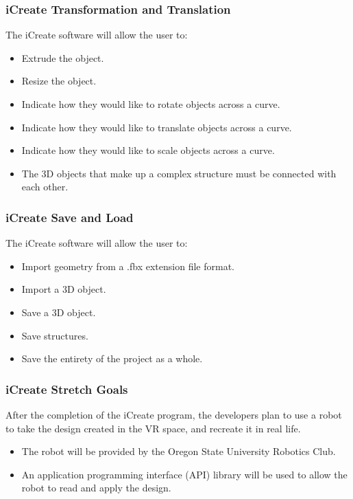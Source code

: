 \documentclass[letterpaper,draftclsnofoot,onecolumn,10 pt,compsoc]{IEEEtran}
\begin{document}
\subsubsection{iCreate Transformation and Translation}
The iCreate software will allow the user to:
\begin{itemize}
\item Extrude the object.
\item Resize the object.
\item Indicate how they would like to rotate objects across a curve. 
\item Indicate how they would like to translate objects across a curve. 
\item Indicate how they would like to scale objects across a curve. 
\item The 3D objects that make up a complex structure must be connected with each other.
\end{itemize}

\subsubsection{iCreate Save and Load}
The iCreate software will allow the user to:
\begin{itemize}
\item Import geometry from a .fbx extension file format.
\item Import a 3D object.
\item Save a 3D object.
\item Save structures.
\item Save the entirety of the project as a whole.
\end{itemize}

\subsubsection{iCreate Stretch Goals}
After the completion of the iCreate program, the developers plan to use a robot to take the design created in the VR space, and recreate it in real life. 
\begin{itemize}
\item The robot will be provided by the Oregon State University Robotics Club.
\item An application programming interface (API) library will be used to allow the robot to read and apply the design.
\end{itemize}

\end{document}
